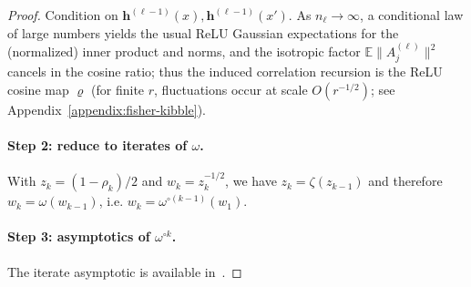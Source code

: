 \begin{proof}
Condition on \(\bm{h}^{(\ell-1)}(x),\bm{h}^{(\ell-1)}(x')\). As \(n_\ell\to\infty\), a conditional law of large numbers yields the usual ReLU Gaussian expectations for the (normalized) inner product and norms, and the isotropic factor \(\mathbb{E}\|A^{(\ell)}_{j}\|^2\) cancels in the cosine ratio; thus the induced correlation recursion is the ReLU cosine map \(\varrho\) (for finite \(r\), fluctuations occur at scale \(O(r^{-1/2})\); see Appendix~\ref{appendix:fisher-kibble}).
\paragraph{Step 2: reduce to iterates of \(\omega\).}
With \(z_k=(1-\rho_k)/2\) and \(w_k=z_k^{-1/2}\), we have \(z_{k}=\zeta(z_{k-1})\) and therefore \(w_k=\omega(w_{k-1})\), i.e. \(w_k=\omega^{\circ(k-1)}(w_1)\).

\paragraph{Step 3: asymptotics of \(\omega^{\circ k}\).}
The iterate asymptotic is available in~\cite[Proposition~3]{terjek2025mlpsateoc}.
\end{proof}

